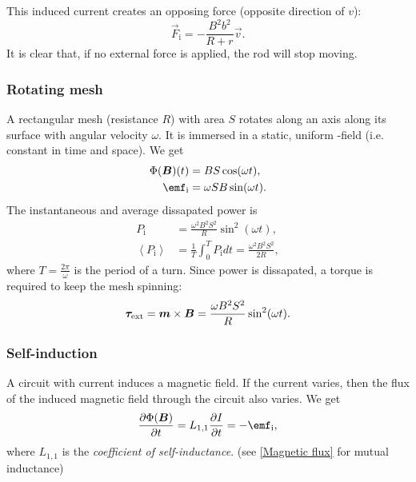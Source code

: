         This induced current creates an opposing force (opposite direction of $v$): 
        \begin{equation}
            \vec{F}_\text{i} = -\frac{B^2b^2}{R+r}\vec{v}.
        \end{equation}
        It is clear that, if no external force is applied, the rod will stop moving.

    \subsubsection*{Rotating mesh}
        A rectangular mesh (resistance $R$) with area $S$ rotates along an axis along its surface with angular velocity $\omega$. 
        It is immersed in a static, uniform \B-field (i.e. constant in time and space).
        We get 
        \begin{align}
            \Phi(\B)(t) &= BS\cos (\omega t), \\
            \emf_\text{i} &= \omega S B \sin (\omega t).
        \end{align}
        The instantaneous and average dissapated power is 
        \begin{align}
            P_\text{i} &= \frac{\omega^2 B^2 S^2}{R}\sin^2(\omega t),\\
            \left<P_\text{i}\right> &= \frac{1}{T}\int_0^T P_\text{i}dt = \frac{\omega^2 B^2 S^2}{2R},
        \end{align}
        where $T = \frac{2\pi}{\omega}$ is the period of a turn.
        Since power is dissapated, a torque is required to keep the mesh spinning: 
        \begin{equation}
            \bm{\tau}_\text{ext} = \bm{m}\times\bm{B} = \frac{\omega B^2 S^2}{R}\sin^2(\omega t).
        \end{equation}
    
    \subsubsection*{Self-induction}
        A circuit with current induces a magnetic field. 
        If the current varies, then the flux of the induced magnetic field through the circuit also varies. 
        We get
        \begin{equation}
            \frac{\partial \Phi(\B)}{\partial t} = L_{1,1}\frac{\partial I}{\partial t} = -\emf_{\text{i}},
        \end{equation}
        where $L_{1,1}$ is the \textit{coefficient of self-inductance}. (see \ref{Magnetic flux} for mutual inductance)
